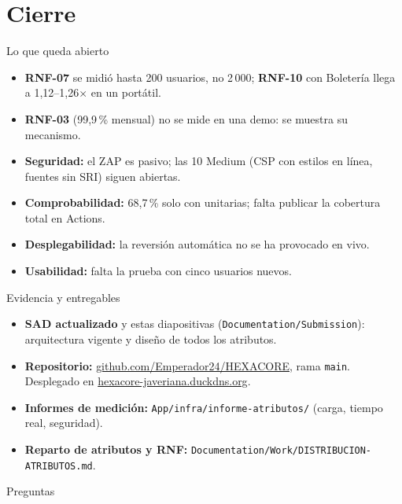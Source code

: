\documentclass[aspectratio=169,10pt,xcolor={table}]{beamer}
\begin{document}
\section{Cierre}

\begin{frame}{Lo que queda abierto}
\small
\begin{itemize}\setlength\itemsep{0.3em}
\item \textbf{RNF-07} se midió hasta 200 usuarios, no 2\,000; \textbf{RNF-10} con Boletería llega a 1,12--1,26$\times$ en un portátil.
\item \textbf{RNF-03} (99,9\,\% mensual) no se mide en una demo: se muestra su mecanismo.
\item \textbf{Seguridad:} el ZAP es pasivo; las 10 Medium (CSP con estilos en línea, fuentes sin SRI) siguen abiertas.
\item \textbf{Comprobabilidad:} 68,7\,\% solo con unitarias; falta publicar la cobertura total en Actions.
\item \textbf{Desplegabilidad:} la reversión automática no se ha provocado en vivo.
\item \textbf{Usabilidad:} falta la prueba con cinco usuarios nuevos.
\end{itemize}
\end{frame}

\begin{frame}{Evidencia y entregables}
\begin{itemize}\setlength\itemsep{0.35em}
\item \textbf{SAD actualizado} y estas diapositivas (\texttt{Documentation/Submission}): arquitectura vigente y diseño de todos los atributos.
\item \textbf{Repositorio:} \href{https://github.com/Emperador24/HEXACORE}{github.com/Emperador24/HEXACORE}, rama \texttt{main}. Desplegado en \href{https://hexacore-javeriana.duckdns.org}{hexacore-javeriana.duckdns.org}.
\item \textbf{Informes de medición:} \texttt{App/infra/informe-atributos/} (carga, tiempo real, seguridad).
\item \textbf{Reparto de atributos y RNF:} \texttt{Documentation/Work/DISTRIBUCION-ATRIBUTOS.md}.
\end{itemize}
\vspace{1em}
\centering\Large Preguntas
\end{frame}
\end{document}
